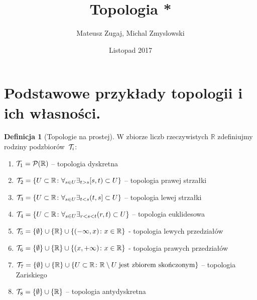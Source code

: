 \documentclass{article}
\title{Topologia *}
\author{Mateusz Zugaj, Michal Zmyslowski}
\date{Listopad 2017}
\theoremstyle{definition}%
\newtheorem{defn}{Definicja}
\theoremstyle{theorem}
\newcommand{\R}{\mathbb{R}} %
\newcommand{\Pow}{\mathcal{P}} %
\begin{document}
	
	\maketitle
	
	\section{Podstawowe przykłady topologii i ich własności.}
	
	\begin{defn}[Topologie na prostej] W zbiorze liczb rzeczywistych  $\R$ zdefiniujmy rodziny podzbiorów~${\cal T}_i$:
		\begin{enumerate}
			\item ${\cal T}_1=\Pow (\R)$ -- topologia dyskretna
			\item ${\cal T}_2=\{U\subset \R\colon  \forall_{s\in U}\exists_{t>s}[s,t)\subset U\}$ -- topologia prawej strzałki
			\item ${\cal T}_3=\{U\subset \R\colon  \forall_{s\in U}\exists_{t<s}(t,s]\subset U\}$ -- topologia lewej strzałki
			\item ${\cal T}_4=\{U\subset \R\colon  \forall_{s\in U}\exists_{r<s<t}(r,t)\subset U\}$  -- topologia euklidesowa
			\item ${\cal T}_5=\{\emptyset\}\cup\{\R\}\cup\{(-\infty,x)\colon x\in \R\}$ - topologia lewych przedziałów
			\item ${\cal T}_6=\{\emptyset\}\cup\{\R\}\cup\{(x,+\infty)\colon x\in \R\}$ - topologia prawych przedziałów
			\item ${\cal T}_7=\{\emptyset\}\cup\{\R\}\cup\{U\subset \R\colon  \R\setminus U \; \hbox{jest zbiorem skończonym}\}$ -- topologia Zariskiego
			\item ${\cal T}_8=\{\emptyset\}\cup\{\R\}$ -- topologia antydyskretna
		\end{enumerate}
	\end{defn}
	
\end{document}
